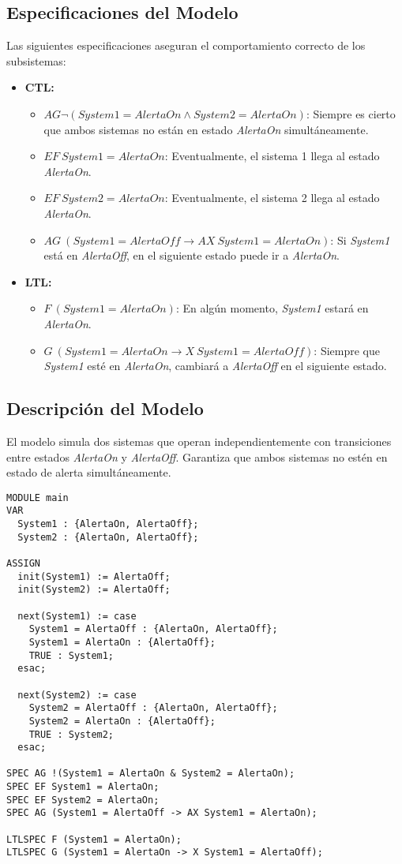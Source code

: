 \subsection*{Especificaciones del Modelo}
Las siguientes especificaciones aseguran el comportamiento correcto de los subsistemas:
\begin{itemize}
    \item \textbf{CTL:}
    \begin{itemize}
        \item $AG \neg(System1 = AlertaOn \land System2 = AlertaOn)$: Siempre es cierto que ambos sistemas no están en estado \textit{AlertaOn} simultáneamente.
        \item $EF\ System1 = AlertaOn$: Eventualmente, el sistema 1 llega al estado \textit{AlertaOn}.
        \item $EF\ System2 = AlertaOn$: Eventualmente, el sistema 2 llega al estado \textit{AlertaOn}.
        \item $AG\ (System1 = AlertaOff \rightarrow AX\ System1 = AlertaOn)$: Si \textit{System1} está en \textit{AlertaOff}, en el siguiente estado puede ir a \textit{AlertaOn}.
    \end{itemize}
    \item \textbf{LTL:}
    \begin{itemize}
        \item $F\ (System1 = AlertaOn)$: En algún momento, \textit{System1} estará en \textit{AlertaOn}.
        \item $G\ (System1 = AlertaOn \rightarrow X\ System1 = AlertaOff)$: Siempre que \textit{System1} esté en \textit{AlertaOn}, cambiará a \textit{AlertaOff} en el siguiente estado.
    \end{itemize}
\end{itemize}

\subsection*{Descripción del Modelo}
El modelo simula dos sistemas que operan independientemente con transiciones entre estados \textit{AlertaOn} y \textit{AlertaOff}. Garantiza que ambos sistemas no estén en estado de alerta simultáneamente.

\begin{lstlisting}
MODULE main
VAR
  System1 : {AlertaOn, AlertaOff};
  System2 : {AlertaOn, AlertaOff};

ASSIGN
  init(System1) := AlertaOff;
  init(System2) := AlertaOff;

  next(System1) := case
    System1 = AlertaOff : {AlertaOn, AlertaOff};
    System1 = AlertaOn : {AlertaOff};
    TRUE : System1;
  esac;

  next(System2) := case
    System2 = AlertaOff : {AlertaOn, AlertaOff};
    System2 = AlertaOn : {AlertaOff};
    TRUE : System2;
  esac;

SPEC AG !(System1 = AlertaOn & System2 = AlertaOn);
SPEC EF System1 = AlertaOn;
SPEC EF System2 = AlertaOn;
SPEC AG (System1 = AlertaOff -> AX System1 = AlertaOn);

LTLSPEC F (System1 = AlertaOn);
LTLSPEC G (System1 = AlertaOn -> X System1 = AlertaOff);
\end{lstlisting}

